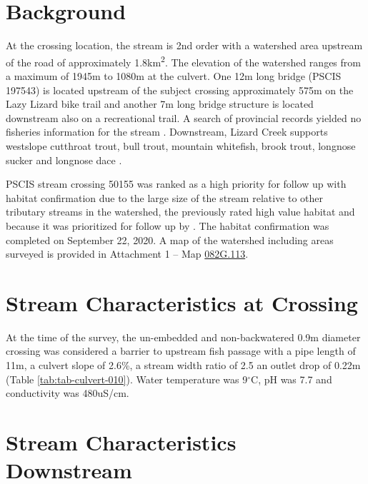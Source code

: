 \documentclass[
]{book}
\begin{document}
\hypertarget{background-1}{%
\section*{Background}\label{background-1}}

At the crossing location, the stream is 2nd order with a watershed area upstream of the road of approximately 1.8km\textsuperscript{2}. The elevation of the watershed ranges from a maximum of 1945m to 1080m at the culvert. One 12m long bridge (PSCIS 197543) is located upstream of the subject crossing approximately 575m on the Lazy Lizard bike trail and another 7m long bridge structure is located downstream also on a recreational trail. A search of provincial records yielded no fisheries information for the stream \citep{moeStreamInventorySample}. Downstream, Lizard Creek supports westslope cutthroat trout, bull trout, mountain whitefish, brook trout, longnose sucker and longnose dace \citep{data_fish_obs}.

PSCIS stream crossing 50155 was ranked as a high priority for follow up with habitat confirmation due to the large size of the stream relative to other tributary streams in the watershed, the previously rated high value habitat and because it was prioritized for follow up by \citet{vastFishPassage2013}. The habitat confirmation was completed on September 22, 2020. A map of the watershed including areas surveyed is provided in Attachment 1 -- Map \href{https://hillcrestgeo.ca/outgoing/fishpassage/projects/elk/FishPassage_082G.113.pdf}{082G.113}.

\hypertarget{stream-characteristics-at-crossing}{%
\section*{Stream Characteristics at Crossing}\label{stream-characteristics-at-crossing}}

At the time of the survey, the un-embedded and non-backwatered 0.9m diameter crossing was considered a barrier to upstream fish passage with a pipe length of 11m, a culvert slope of 2.6\%, a stream width ratio of 2.5 an outlet drop of 0.22m (Table \ref{tab:tab-culvert-010}). Water temperature was 9\(^\circ\)C, pH was 7.7 and conductivity was 480uS/cm.

\hypertarget{stream-characteristics-downstream}{%
\section*{Stream Characteristics Downstream}\label{stream-characteristics-downstream}}
\end{document}
